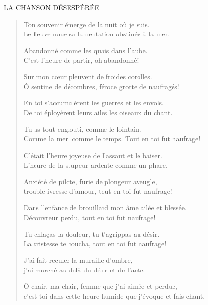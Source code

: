 \documentclass[11pt,a4paper]{book}
\begin{document}
\cleardoublepage

\thispagestyle{empty}
\vspace*{80mm}
\begin{center}
{\huge LA CHANSON DÉSESPÉRÉE}
\end{center}

\cleardoublepage



\begin{verse}
  Ton souvenir émerge de la nuit où je suis. \\
  Le fleuve noue sa lamentation obstinée à la mer.

  Abandonné comme les quais dans l'aube. \\
  C'est l'heure de partir, oh abandonné!

  Sur mon cœur pleuvent de froides corolles. \\
  Ô sentine de décombres, féroce grotte de naufragés!

  En toi s'accumulèrent les guerres et les envols. \\
  De toi éployèrent leurs ailes les oiseaux du chant.

  Tu as tout englouti, comme le lointain. \\
  Comme la mer, comme le temps. Tout en toi fut naufrage!

  C'était l'heure joyeuse de l'assaut et le baiser. \\
  L'heure de la stupeur ardente comme un phare.

  Anxiété de pilote, furie de plongeur aveugle, \\
  trouble ivresse d'amour, tout en toi fut naufrage!

  Dans l'enfance de brouillard mon âme ailée et blessée. \\
  Découvreur perdu, tout en toi fut naufrage!

  Tu enlaças la douleur, tu t'agrippas au désir. \\
  La tristesse te coucha, tout en toi fut naufrage!

  J'ai fait reculer la muraille d'ombre, \\
  j'ai marché au-delà du désir et de l'acte.

  Ô chair, ma chair, femme que j'ai aimée et perdue, \\
  c'est toi dans cette heure humide que j'évoque et fais chant.


\end{verse}
\end{document}
